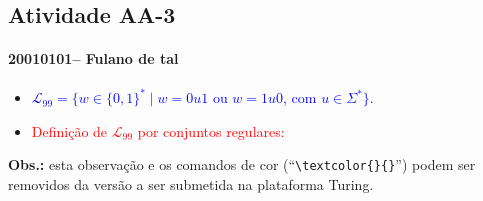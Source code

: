 \documentclass[12pt]{article}
\def\discente{Fulano de tal}
\def\matricula{20010101}
\def\aa{3}
\def\myling{{99}} %
\begin{document}
\subsection*{Atividade AA-\aa}
 \paragraph{\matricula -- \discente}
%
 \begin{itemize}
  \item \textcolor{blue}{$\mathcal{L}_\myling = \{w\in\{0,1\}^*\mid w=0u1$ ou $w=1u0$, com $u\in\Sigma^*\}$.}
%
  \item  \textcolor{red}{Definição de $\mathcal{L}_\myling$ por conjuntos regulares:
%
  }
% 
 \end{itemize}
%
\noindent\textbf{Obs.:} esta observação e os comandos de cor (``\verb|\textcolor{}{}|'') podem ser removidos da versão a ser submetida na plataforma Turing.
\end{document}
